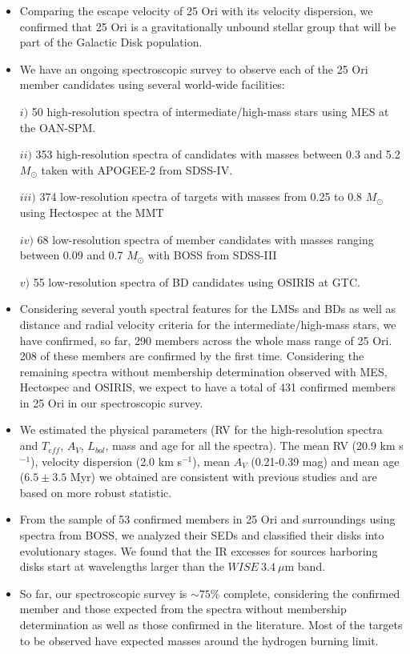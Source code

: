 \documentclass[12pt]{article}
\begin{document}
\begin{itemize}
	\item Comparing the escape velocity of 25 Ori with its velocity dispersion, we confirmed that 25 Ori is a gravitationally unbound stellar group that will be part of the Galactic Disk population.
	\item We have an ongoing spectroscopic survey to observe each of the 25 Ori member candidates using several world-wide facilities: \par %
		$i)$ 50 high-resolution spectra of intermediate/high-mass stars using MES at the OAN-SPM. \par
		$ii)$ 353 high-resolution spectra of candidates with masses between 0.3 and 5.2 $M_\odot$ taken with APOGEE-2 from SDSS-IV. \par
		$iii)$ 374 low-resolution spectra of targets with masses from 0.25 to 0.8 $M_\odot$ using Hectospec at the MMT \par
		$iv)$ 68 low-resolution spectra of member candidates with masses ranging between 0.09 and 0.7 $M_\odot$ with BOSS from SDSS-III \par
		$v)$ 55 low-resolution spectra of BD candidates using OSIRIS at GTC.
	\item Considering several youth spectral features for the LMSs and BDs as well as distance and radial velocity criteria for the intermediate/high-mass stars, we have confirmed, so far, 290 members across the whole mass range of 25 Ori. 208 of these members are confirmed by the first time. Considering the remaining spectra without membership determination observed with MES, Hectospec and OSIRIS, we expect to have a total of 431 confirmed members in 25 Ori in our spectroscopic survey.
	\item We estimated the physical parameters (RV for the high-resolution spectra and $T_{eff}$, $A_V$, $L_{bol}$, mass and age for all the spectra). The mean RV (20.9 km s$^{-1}$), velocity dispersion (2.0 km s$^{-1}$), mean $A_V$ (0.21-0.39 mag) and mean age ($6.5\pm3.5$ Myr) we obtained are consistent with previous studies and are based on more robust statistic.
	\item From the sample of 53 confirmed members in 25 Ori and surroundings using spectra from BOSS, we analyzed their SEDs and classified their disks into evolutionary stages. We found that the IR excesses for sources harboring disks start at wavelengths larger than the $WISE\ 3.4\ \mu$m band.
	\item So far, our spectroscopic survey is $\sim75\%$ complete, considering the confirmed member and those expected from the spectra without membership determination as well as those confirmed in the literature. Most of the targets to be observed have expected masses around the hydrogen burning limit.
\end{itemize}
\end{document}
